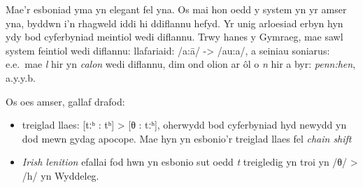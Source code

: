 Mae'r esboniad yma yn elegant fel yna. Os mai hon oedd y system yn yr amser yna, byddwn i'n rhagweld iddi hi ddiflannu hefyd. Yr unig arloesiad erbyn hyn ydy bod cyferbyniad meintiol wedi diflannu. Trwy hanes y Gymraeg, mae sawl system feintiol wedi diflannu: llafariaid: /a:\=a/ -> /au:a/, a seiniau soniarus: e.e.\ mae \textit{l} hir yn \textit{calon} wedi diflannu, dim ond olion ar \^ol o \textit{n} hir a byr: \textit{penn:hen}, a.y.y.b.

Os oes amser, gallaf drafod:
\begin{itemize}
\item  treiglad llaes: [tːʰ : tʰ] > [θ : tːʰ], oherwydd bod cyferbyniad hyd newydd yn dod mewn gydag apocope. Mae hyn yn esbonio'r treiglad llaes fel \textit{chain shift}
\item \textit{Irish lenition} efallai fod hwn yn esbonio sut oedd \textit{t} treigledig yn troi yn /θ/ > /h/ yn Wyddeleg.
\end{itemize}






